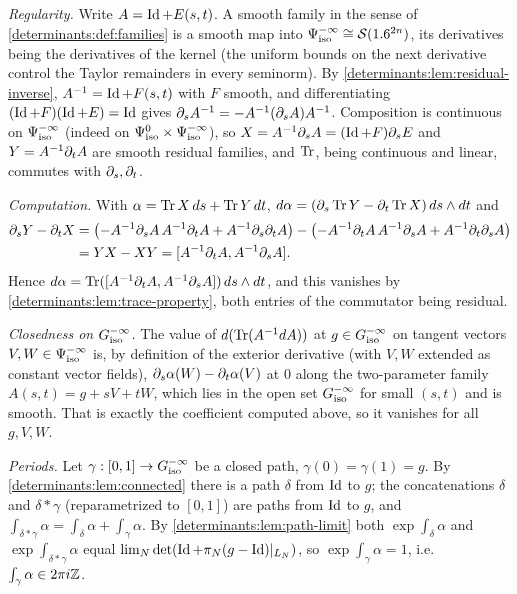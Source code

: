 \subsection*{}
\emph{Regularity.} Write $A=\operatorname{Id}+E(s,t)$. A smooth family in the sense of
\cref{determinants:def:families} is a smooth map into $\Psi^{-\infty}_{\mathrm{iso}}\cong\mathcal{S}(1.6^{2n})$, its
derivatives being the derivatives of the kernel (the uniform bounds on the next derivative
control the Taylor remainders in every seminorm). By \cref{determinants:lem:residual-inverse},
$A^{-1}=\operatorname{Id}+F(s,t)$ with $F$ smooth, and differentiating $(\operatorname{Id}+F)(\operatorname{Id}+E)=\operatorname{Id}$ gives
$\partial_sA^{-1}=-A^{-1}(\partial_sA)A^{-1}$. Composition is continuous on $\Psi^{-\infty}_{\mathrm{iso}}$ (indeed on
$\Psi^{0}_{\mathrm{iso}}\times\Psi^{-\infty}_{\mathrm{iso}}$), so $X=A^{-1}\partial_sA=(\operatorname{Id}+F)\partial_sE$ and $Y=A^{-1}\partial_tA$ are smooth
residual families, and $\operatorname{Tr}$, being continuous and linear, commutes with $\partial_s,\partial_t$.

\emph{Computation.} With $\alpha=\operatorname{Tr} X\,ds+\operatorname{Tr} Y\,dt$, $d\alpha=(\partial_s\operatorname{Tr} Y-\partial_t\operatorname{Tr} X)\,ds\wedge dt$ and
\begin{align*}
  \partial_sY-\partial_tX&=\bigl(-A^{-1}\partial_sA\,A^{-1}\partial_tA+A^{-1}\partial_s\partial_tA\bigr)-\bigl(-A^{-1}\partial_tA\,A^{-1}\partial_sA+A^{-1}\partial_t\partial_sA\bigr)\\
  &=YX-XY=[A^{-1}\partial_tA,A^{-1}\partial_sA].
\end{align*}
Hence $d\alpha=\operatorname{Tr}([A^{-1}\partial_tA,A^{-1}\partial_sA])\,ds\wedge dt$, and this vanishes by
\cref{determinants:lem:trace-property}, both entries of the commutator being residual.

\emph{Closedness on $G^{-\infty}_{\mathrm{iso}}$.} The value of $d(\operatorname{Tr}(A^{-1}dA))$ at $g\in G^{-\infty}_{\mathrm{iso}}$ on
tangent vectors $V,W\in\Psi^{-\infty}_{\mathrm{iso}}$ is, by definition of the exterior derivative (with $V,W$
extended as constant vector fields), $\partial_s\alpha(W)-\partial_t\alpha(V)$ at $0$ along the two-parameter
family $A(s,t)=g+sV+tW$, which lies in the open set $G^{-\infty}_{\mathrm{iso}}$ for small $(s,t)$ and is
smooth. That is exactly the coefficient computed above, so it vanishes for all $g,V,W$.

\emph{Periods.} Let $\gamma:[0,1]\to G^{-\infty}_{\mathrm{iso}}$ be a closed path, $\gamma(0)=\gamma(1)=g$. By
\cref{determinants:lem:connected} there is a path $\delta$ from $\operatorname{Id}$ to $g$; the concatenations
$\delta$ and $\delta\ast\gamma$ (reparametrized to $[0,1]$) are paths from $\operatorname{Id}$ to $g$, and
$\int_{\delta\ast\gamma}\alpha=\int_\delta\alpha+\int_\gamma\alpha$. By
\cref{determinants:lem:path-limit} both $\exp\int_\delta\alpha$ and $\exp\int_{\delta\ast\gamma}\alpha$ equal
$\lim_N\det(\operatorname{Id}+\pi_N(g-\operatorname{Id})|_{L_N})$, so $\exp\int_\gamma\alpha=1$, i.e.\ $\int_\gamma\alpha\in2\pi i\mathbb{Z}$.


